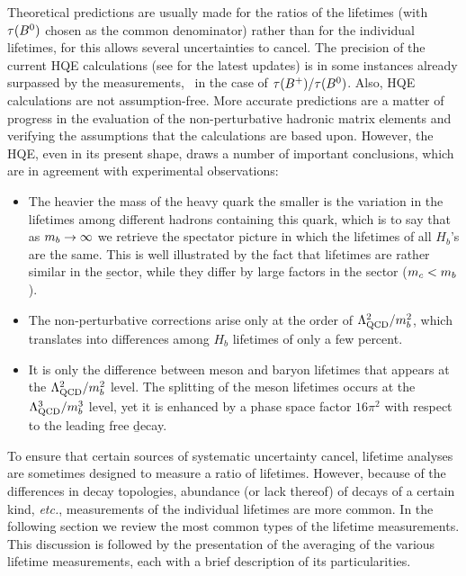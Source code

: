 Theoretical predictions are usually made for the ratios of the lifetimes
(with $\tau(B^0)$ chosen as the common denominator) rather than for the
individual lifetimes, for this allows several uncertainties to cancel.
The precision of the current HQE calculations (see
 for the latest updates)
is in some instances already surpassed by the measurements,
\eg\ in the case of $\tau(B^+)/\tau(B^0)$.  Also, HQE calculations are
not assumption-free.  More accurate predictions are a matter of progress
in the evaluation of the non-perturbative hadronic matrix elements and
verifying the assumptions that the calculations are based upon.
However, the HQE, even in its present shape, draws a number of important
conclusions, which are in agreement with experimental observations:
\begin{itemize}
\item The heavier the mass of the heavy quark the smaller is the
  variation in the lifetimes among different hadrons containing this
  quark, which is to say that as $m_{b}\to\infty$ we retrieve the
  spectator picture in which the lifetimes of all $H_b$'s are the same.
   This is well illustrated by the fact that lifetimes are rather
   similar in the \b sector, while they differ by large factors
   in the  sector ($m_{c}<m_{b}$).
\item The non-perturbative corrections arise only at the order of
  $\Lambda_{\rm QCD}^2/m_{b}^2$, which translates into 
  differences among $H_b$ lifetimes of only a few percent.
\item It is only the difference between meson and baryon lifetimes that
  appears at the $\Lambda_{\rm QCD}^2/m_{b}^2$ level.  The splitting of the
  meson lifetimes occurs at the $\Lambda_{\rm QCD}^3/m_{b}^3$ level, yet it is
  enhanced by a phase space factor $16\pi^2$ with respect to the leading
  free \b decay.
\end{itemize}

To ensure that certain sources of systematic uncertainty cancel, 
lifetime analyses are sometimes designed to measure a 
ratio of lifetimes.  However, because of the differences in decay
topologies, abundance (or lack thereof) of decays of a certain kind,
{\em etc.}, measurements of the individual lifetimes are more 
common.  In the following section we review the most common
types of the lifetime measurements.  This discussion is followed by the
presentation of the averaging of the various lifetime measurements, each
with a brief description of its particularities.


